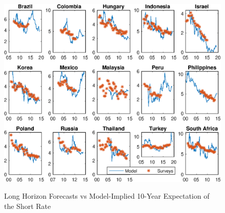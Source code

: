 \documentclass{article}
\begin{document}
	\begin{figure}[tbph]
		\caption{Long Horizon Forecasts vs Model-Implied 10-Year Expectation of the Short Rate} \label{fig:bsl_yP_scbp}
		\begin{center}								%
			\begin{minipage}{0.9\linewidth}
				\begin{center}							%
					\includegraphics[trim={0cm 0cm 0cm 0cm},clip,height=0.86\textheight,width=\linewidth]{../Figures/Estimation/bsl_yP_scbp.eps} \\
				\end{center}
			\end{minipage}
		\end{center}
	\end{figure}
\end{document}
